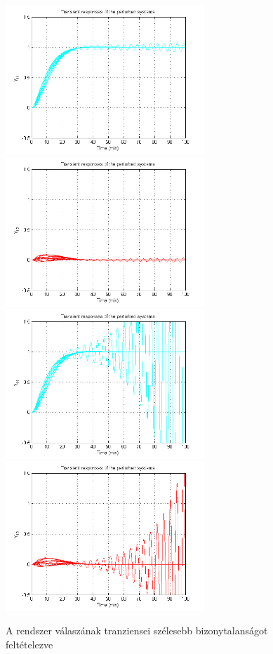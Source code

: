 \begin{figure}[!ht]
	\includegraphics[width=75mm,keepaspectratio]{figures/2m06/prt_small_1.png}
	\includegraphics[width=75mm,keepaspectratio]{figures/2m06/prt_small_2.png}\vspace{2mm}
	\includegraphics[width=75mm,keepaspectratio]{figures/2m06/prt_big_1.png}
	\includegraphics[width=75mm,keepaspectratio]{figures/2m06/prt_big_2.png}
		\caption{A rendszer válaszának tranziensei szélesebb bizonytalanságot feltételezve}
	\label{fig:PrtMod}
\end{figure}

